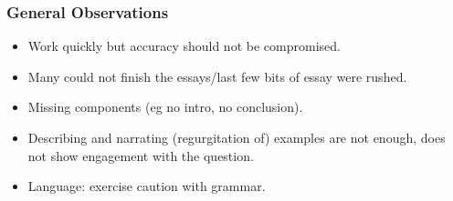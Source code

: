\documentclass[../main.tex]{subfiles}
\begin{document}
        \subsubsection*{General Observations}
        \begin{itemize}
            \item Work quickly but accuracy should not be compromised.
            \item Many could not finish the essays/last few bits of essay were rushed.
            \item Missing components (eg no intro, no conclusion).
            \item Describing and narrating (regurgitation of) examples are not enough, does not show engagement with the question.
            \item Language: exercise caution with grammar.
        \end{itemize}
\end{document}
